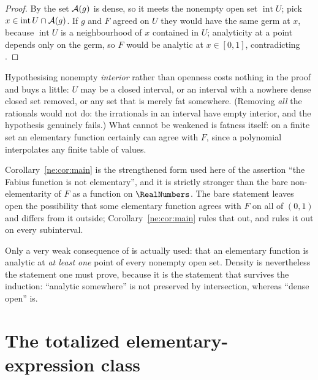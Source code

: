 \begin{proof}
By  the set $\mathcal A(g)$ is dense, so it meets the nonempty open
set $\operatorname{int}U$; pick $x\in\operatorname{int}U\cap\mathcal A(g)$.  If $g$
and $F$ agreed on $U$ they would have the same germ at $x$, because
$\operatorname{int}U$ is a neighbourhood of $x$ contained in $U$; analyticity
at a point depends only on the germ, so $F$ would be analytic at $x\in[0,1]$,
contradicting .
\end{proof}

\begin{remark}
Hypothesising nonempty \emph{interior} rather than openness costs nothing in
the proof and buys a little: $U$ may be a closed interval, or an interval with
a nowhere dense closed set removed, or any set that is merely fat somewhere.
(Removing \emph{all} the rationals would not do: the irrationals in an
interval have empty interior, and the hypothesis genuinely fails.)
What cannot be weakened is fatness itself: on a finite set an elementary
function certainly can agree with $F$, since a polynomial interpolates any
finite table of values.
\end{remark}

\begin{boxedremark}
Corollary~\ref{ne:cor:main} is the strengthened form used here of the assertion
``the Fabius function is not elementary'', and it is strictly stronger than the bare
non-elementarity of $F$ as a function on $\RealNumbers$.  The bare statement leaves
open the possibility that some elementary function agrees with $F$ on all of
$(0,1)$ and differs from it outside; Corollary~\ref{ne:cor:main} rules that out, and rules
it out on every subinterval.
\end{boxedremark}

\begin{remark}
Only a very weak consequence of  is actually used: that an
elementary function is analytic at \emph{at least one} point of every nonempty
open set.  Density is nevertheless the statement one must prove, because it is
the statement that survives the induction: ``analytic somewhere'' is not
preserved by intersection, whereas ``dense open'' is.
\end{remark}

\section{The totalized elementary-expression class}\label{ne:sec:elem}

